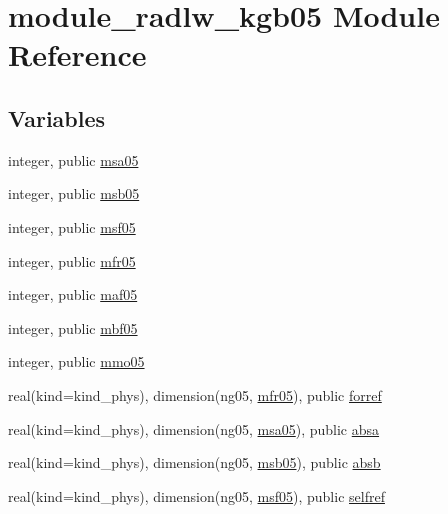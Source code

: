 \hypertarget{namespacemodule__radlw__kgb05}{}\section{module\+\_\+radlw\+\_\+kgb05 Module Reference}
\label{namespacemodule__radlw__kgb05}
\subsection*{Variables}
\begin{DoxyCompactItemize}
\item 
integer, public \hyperlink{namespacemodule__radlw__kgb05_a79c5177c6d0e56a69f4d1a0704879539}{msa05}
\item 
integer, public \hyperlink{group__module__radlw__main_ga0f3b6573bfe94c5a5968cda2dc8b1adf}{msb05}
\item 
integer, public \hyperlink{group__module__radlw__main_ga1c9a43b7011e7328fa62d3ecd29acc73}{msf05}
\item 
integer, public \hyperlink{group__module__radlw__main_ga44f07da9a7f99377f7d331249c475b80}{mfr05}
\item 
integer, public \hyperlink{group__module__radlw__main_gaba904215976d7f4316b52c8f0cffe595}{maf05}
\item 
integer, public \hyperlink{group__module__radlw__main_ga57db9a9cb9acac604df555038f6127a3}{mbf05}
\item 
integer, public \hyperlink{group__module__radlw__main_gaa552aae4878030144218ca6c2bbe417f}{mmo05}
\item 
real(kind=kind\+\_\+phys), dimension(ng05, \hyperlink{group__module__radlw__main_ga44f07da9a7f99377f7d331249c475b80}{mfr05}), public \hyperlink{group__module__radlw__main_ga6ff0c311db14b41c9bdf1170164adc3a}{forref}
\item 
real(kind=kind\+\_\+phys), dimension(ng05, \hyperlink{namespacemodule__radlw__kgb05_a79c5177c6d0e56a69f4d1a0704879539}{msa05}), public \hyperlink{group__module__radlw__main_ga30ce809b40dd99b3219996ac8f023274}{absa}
\item 
real(kind=kind\+\_\+phys), dimension(ng05, \hyperlink{group__module__radlw__main_ga0f3b6573bfe94c5a5968cda2dc8b1adf}{msb05}), public \hyperlink{group__module__radlw__main_gaebc667b0569824bba455e822eaea6112}{absb}
\item 
real(kind=kind\+\_\+phys), dimension(ng05, \hyperlink{group__module__radlw__main_ga1c9a43b7011e7328fa62d3ecd29acc73}{msf05}), public \hyperlink{group__module__radlw__main_ga3c727eabe159c88fca912f33a2b91943}{selfref}

\end{DoxyCompactItemize}
